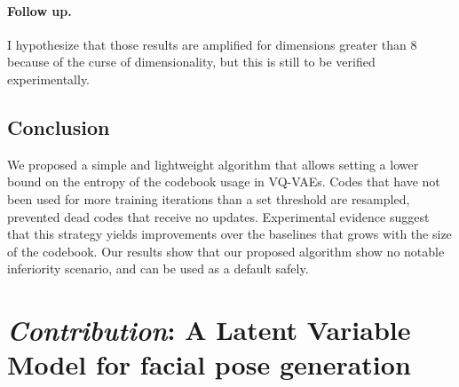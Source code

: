 \paragraph{Follow up.}
I hypothesize that those results are amplified for dimensions greater than 8 because of the curse of dimensionality, but this is still to be verified experimentally.

\subsection{Conclusion}

We proposed a simple and lightweight algorithm that allows setting a lower bound on the entropy of the codebook usage in VQ-VAEs. Codes that have not been used for more training iterations than a set threshold are resampled, prevented dead codes that receive no updates. Experimental evidence suggest that this strategy yields improvements over the baselines that grows with the size of the codebook. Our results show that our proposed algorithm show no notable inferiority scenario, and can be used as a default safely. 

\section{\emph{\arr Contribution}: A Latent Variable Model for facial pose generation}
\label{sec:facegen}

